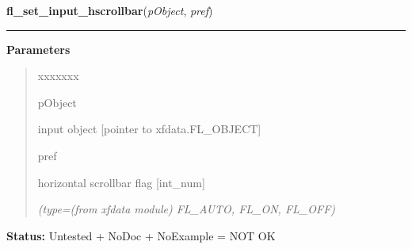 \hspace{.8\funcindent}\begin{boxedminipage}{\funcwidth}

    \raggedright \textbf{fl\_set\_input\_hscrollbar}(\textit{pObject}, \textit{pref})

    \vspace{-1.5ex}

    \rule{\textwidth}{0.5\fboxrule}
\setlength{\parskip}{2ex}
\setlength{\parskip}{1ex}
      \textbf{Parameters}
      \vspace{-1ex}

      \begin{quote}
        \begin{Ventry}{xxxxxxx}

          \item[pObject]

          input object [pointer to xfdata.FL\_OBJECT]

          \item[pref]

          horizontal scrollbar flag [int\_num]

            {\it (type=(from xfdata module) FL\_AUTO, FL\_ON, FL\_OFF)}

        \end{Ventry}

      \end{quote}

\textbf{Status:} Untested + NoDoc + NoExample = NOT OK



    \end{boxedminipage}

    \label{xformslib:library:fl_set_input_vscrollbar}

    \vspace{0.5ex}

